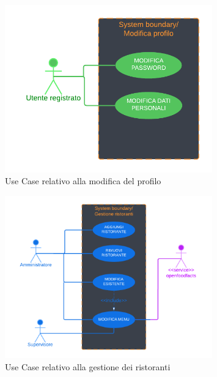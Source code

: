         \begin{figure}[H]
            \centering
            \includegraphics[width=0.8\textwidth]{assets/diagrammi/Use-Case/Modifica Profilo.png}
            \caption{Use Case relativo alla modifica del profilo}
            \label{fig:ucdModProfile}
        \end{figure}

        \begin{figure}[H]
            \centering
            \includegraphics[width=0.8\textwidth]{assets/diagrammi/Use-Case/Gestione ristoranti.png}
            \caption{Use Case relativo alla gestione dei ristoranti}
            \label{fig:ucdResturantMgmt}
        \end{figure}

